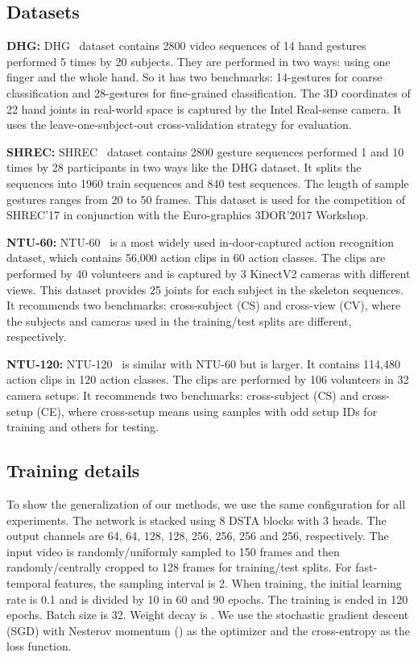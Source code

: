 \documentclass[runningheads]{llncs}
\begin{document}
\subsection{Datasets}
\textbf{DHG:} DHG~\cite{de_smedt_skeleton-based_2016} dataset contains 2800 video sequences of 14 hand gestures performed 5 times by 20 subjects. They are performed in two ways: using one finger and the whole hand. So it has two benchmarks: 14-gestures for coarse classification and 28-gestures for fine-grained classification. The 3D coordinates of 22 hand joints in real-world space is captured by the Intel Real-sense camera. It uses the leave-one-subject-out cross-validation strategy for evaluation. 

\textbf{SHREC:} SHREC~\cite{de_smedt_shrec17_2017} dataset contains 2800 gesture sequences performed 1 and 10 times by 28 participants in two ways like the DHG dataset. It splits the sequences into 1960 train sequences and 840 test sequences. The length of sample gestures ranges from 20 to 50 frames. This dataset is used for the competition of SHREC'17 in conjunction with the Euro-graphics 3DOR'2017 Workshop. 

\textbf{NTU-60:} NTU-60~\cite{shahroudy_ntu_2016} is a most widely used in-door-captured action recognition dataset, which contains 56,000 action clips in 60 action classes. The clips are performed by 40 volunteers and is captured by 3 KinectV2 cameras with different views. This dataset provides 25 joints for each subject in the skeleton sequences. It recommends two benchmarks: cross-subject (CS) and cross-view (CV), where the subjects and cameras used in the training/test splits are different, respectively. 

\textbf{NTU-120:} NTU-120~\cite{shahroudy_ntu_2016} is similar with NTU-60 but is larger. It contains 114,480 action clips in 120 action classes. The clips are performed by 106 volunteers in 32 camera setups. It recommends two benchmarks: cross-subject (CS) and cross-setup (CE), where cross-setup means using samples with odd setup IDs for training and others for testing. 

\subsection{Training details}
To show the generalization of our methods, we use the same configuration for all experiments. 
The network is stacked using 8 DSTA blocks with 3 heads. The output channels are 64, 64, 128, 128, 256, 256, 256 and 256, respectively. 
The input video is randomly/uniformly sampled to 150 frames and then randomly/centrally cropped to 128 frames for training/test splits. 
For fast-temporal features, the sampling interval is 2. 
When training, the initial learning rate is 0.1 and is divided by 10 in 60 and 90 epochs. 
The training is ended in 120 epochs. 
Batch size is 32. Weight decay is . 
We use the stochastic gradient descent (SGD) with Nesterov momentum () as the optimizer and the cross-entropy as the loss function. 
\end{document}
